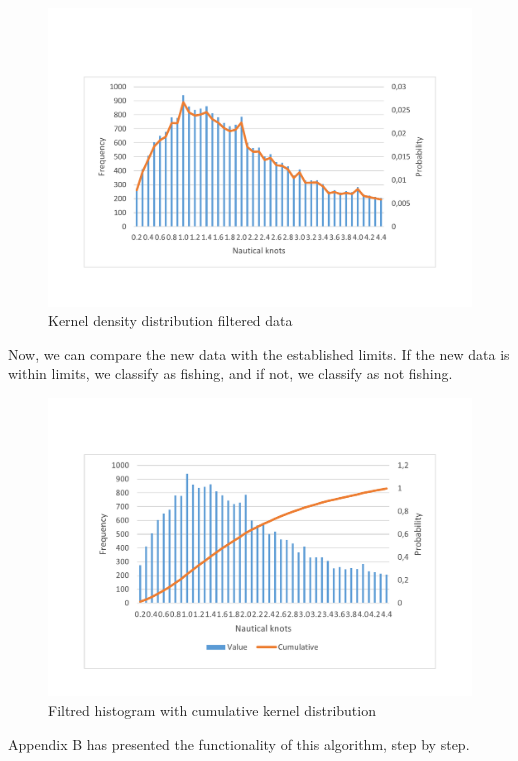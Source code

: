 \begin{enumerate}
\end{enumerate} 

\begin{figure}[]
\centering
\includegraphics[trim=0 50 0 50,width=0.8\linewidth]{Chapters/img/hist_kernel.pdf}
\caption{Kernel density distribution filtered data}
\label{fig:hist_kernel}
\end{figure}


Now, we can compare the new data with the established limits. If the new data is within limits, we classify as fishing, and if not, we classify as not fishing.

\begin{figure}[]
\centering
\includegraphics[trim=0 50 0 50,width=0.8\linewidth]{Chapters/img/hist_comulative.pdf}
\caption{Filtred histogram with cumulative kernel distribution}
\label{fig:hist_comulative}
\end{figure}

Appendix B has presented the functionality of this algorithm, step by step. 



